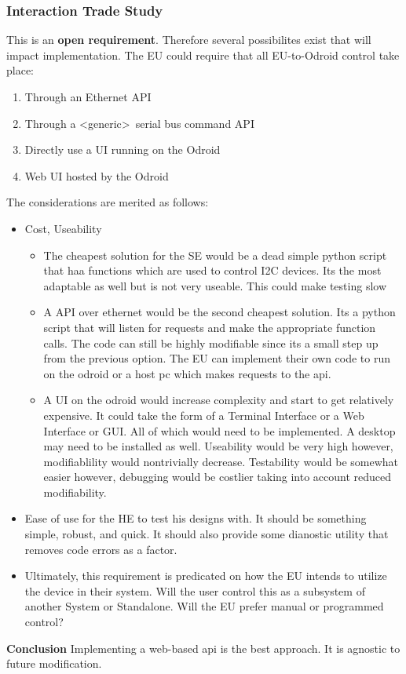 \documentclass[11pt,letterpaper]{article}
\begin{document}
\subsubsection{Interaction Trade Study}
\label{sec:undefined_ui_req}
This is an {\color{red} \textbf{open requirement}}. Therefore several possibilites exist that will impact implementation.
The EU could require that all EU-to-Odroid control take place:
\begin{enumerate}
    \item Through an Ethernet API
    \item Through a \textless generic\textgreater \ serial bus command API
    \item Directly use a UI running on the Odroid
    \item Web UI hosted by the Odroid 
\end{enumerate}

The considerations are merited as follows:
\begin{itemize}
    \item Cost, Useability
    \begin{itemize}

        \item The cheapest solution for the SE would be a dead simple python script that haa functions which
            are used to control I2C devices. Its the most adaptable as well but is not very useable. This could
            make testing slow
        \item A API over ethernet would be the second cheapest solution. Its a python script that will listen for
            requests and make the appropriate function calls. The code can still be highly modifiable since its a small step
            up from the previous option. The EU can implement their own code to run on the odroid or a host pc which makes requests to the api.
        \item A UI on the odroid would increase complexity and start to get relatively expensive. It could take the form of a 
            Terminal Interface or a Web Interface or GUI. All of which would need to be implemented. 
            A desktop may need to be installed as well. Useability would be very high however, modifiablility would nontrivially decrease. Testability
            would be somewhat easier however, debugging would be costlier taking into account reduced modifiability.

    \end{itemize}
    \item Ease of use for the HE to test his designs with. It should be something simple, robust, and quick. It should also provide some
        dianostic utility that removes code errors as a factor.
 
    \item Ultimately, this requirement is predicated on how the EU intends to utilize the device in their system. Will the user control this as
        a subsystem of another System or Standalone. Will the EU prefer manual or programmed control?
\end{itemize}
\textbf{Conclusion} Implementing a web-based api is the best approach. It is agnostic to future modification. 
\end{document}
